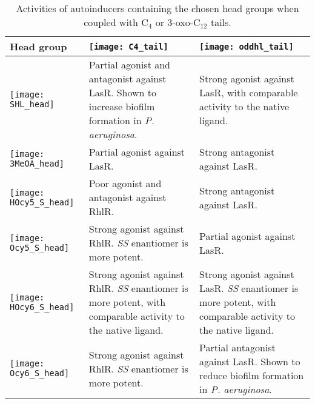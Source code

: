 \begin{table}[H]
  \centering
\begin{tabular}{|P{0.18\textwidth}|p{0.32\textwidth}|p{0.32\textwidth}|}
\hline 
 \vspace{8px}\textbf{Head group} & \vspace{0px}\centering\texttt{[image: C4\_tail]} & \centering\arraybackslash\vspace{0px}\texttt{[image: oddhl\_tail]} \\ 
\hline 
 \vspace{0px}\texttt{[image: SHL\_head]} & Partial agonist and antagonist against LasR\cite{McInnis2011}. Shown to increase biofilm formation in \textit{P. aeruginosa}\cite{Ganguly2011}.
 & Strong agonist against LasR, with comparable activity to the native ligand\cite{Smith2003,Boursier2018,Passador1996,McInnis2011}. \\ 
\hline 
 \vspace{0px}\texttt{[image: 3MeOA\_head]} 
 & Partial agonist against LasR\cite{Hodgkinson2012a}. 
 & Strong antagonist against LasR\cite{Hodgkinson2012a}. \\ 
\hline 
 \vspace{0px}\texttt{[image: HOcy5\_S\_head]} 
 & Poor agonist and antagonist against RhlR\cite{Smith2003a,Jog2006}.
 & Strong antagonist against LasR\cite{Smith2003a}.\\ 
\hline 
 \vspace{0px}\texttt{[image: Ocy5\_S\_head]} 
 & Strong agonist against RhlR\cite{Smith2003a}. \textit{SS} enantiomer is more potent\cite{Jog2006}.
 & Partial agonist against LasR\cite{Smith2003a}. \\ 
\hline 
 \vspace{0px}\texttt{[image: HOcy6\_S\_head]} 
 & Strong agonist against RhlR\cite{Smith2003a}. \textit{SS} enantiomer is more potent, with comparable activity to the native ligand\cite{Jog2006}.
 & Strong agonist against LasR\cite{Smith2003,Smith2003a}. \textit{SS} enantiomer is more potent, with comparable activity to the native ligand\cite{Jog2006}.\\ 
\hline 
 \vspace{0px}\texttt{[image: Ocy6\_S\_head]} 
 & Strong agonist against RhlR\cite{Smith2003a}. \textit{SS} enantiomer is more potent\cite{Jog2006}.
 & Partial antagonist against LasR\cite{Smith2003a}. Shown to reduce biofilm formation in \textit{P. aeruginosa}\cite{Smith2003a}.\\ 
\hline 
\end{tabular}
\caption{Activities of autoinducers containing the chosen head groups when coupled with C$_4$ or 3-oxo-C$_{12}$ tails.\label{tbl:head_groups}} 
\end{table}

